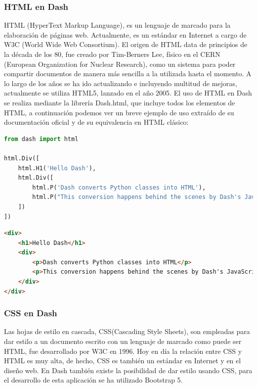 \documentclass[a4paper, 12pt, oneside]{book}
\begin{document}
\subsubsection{HTML en Dash}
\label{subsubsec:html}
HTML (HyperText Markup Language), es un lenguaje de marcado para la elaboración de páginas web. Actualmente, es un estándar en Internet a cargo de W3C (World Wide Web Consortium).
El origen de HTML data de principios de la década de los 80, fue creado por Tim-Berners Lee, físico en el CERN (European Organization for Nuclear Research), como un sistema para poder compartir documentos de manera más sencilla a la utilizada hasta el momento. A lo largo de los años se ha ido actualizando e incluyendo multitud de mejoras, actualmente se utiliza HTML5, lanzado en el año 2005.
El uso de HTML en Dash se realiza mediante la librería Dash.html, que incluye todos los elementos de HTML, a continuación podemos ver un breve ejemplo de uso extraído de su documentación oficial y de su equivalencia en HTML clásico:

\begin{lstlisting}[language=Python]
from dash import html

html.Div([
    html.H1('Hello Dash'),
    html.Div([
        html.P('Dash converts Python classes into HTML'),
        html.P("This conversion happens behind the scenes by Dash's JavaScript front-end")
    ])
])
\end{lstlisting}

\begin{lstlisting}[language=HTML]
<div>
    <h1>Hello Dash</h1>
    <div>
        <p>Dash converts Python classes into HTML</p>
        <p>This conversion happens behind the scenes by Dash's JavaScript front-end</p>
    </div>
</div>
\end{lstlisting}


\subsubsection{CSS en Dash}
\label{subsubsec:css}
Las hojas de estilo en cascada, CSS(Cascading Style Sheets), son empleadas para dar estilo a un documento escrito con un lenguaje de marcado como puede ser HTML, fue desarrollado por W3C en 1996. Hoy en día la relación entre CSS y HTML es muy alta, de hecho, CSS es también un estándar en Internet y en el diseño web. En Dash también existe la posibilidad de dar estilo usando CSS, para el desarrollo de esta aplicación se ha utilizado Bootstrap 5.
\end{document}

